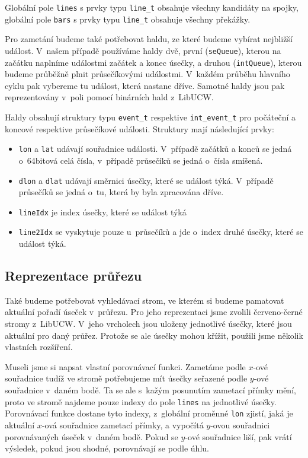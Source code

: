 Globální pole \verb|lines| s prvky typu \verb|line_t| obsahuje všechny kandidáty
na spojky, globální pole \verb|bars| s prvky typu \verb|line_t| obsahuje všechny
překážky. 

Pro zametání budeme také potřebovat haldu, ze které budeme vybírat nejbližší
událost. V~našem případě používáme haldy dvě, první (\verb|seQueue|), kterou na
začátku naplníme událostmi začátek a konec úsečky, a druhou (\verb|intQueue|),
kterou budeme průběžně plnit průsečíkovými událostmi. V~každém průběhu hlavního
cyklu pak vybereme tu událost, která nastane dříve. Samotné haldy jsou pak
reprezentovány v~poli pomocí binárních hald z~LibUCW. 

Haldy obsahují struktury typu \verb|event_t| respektive \verb|int_event_t| pro
počáteční a koncové respektive průsečíkové události. Struktury mají následující
prvky:
\begin{itemize}
	\item \verb|lon| a \verb|lat| udávají souřadnice události. V~případě
	začátků a konců se jedná o~64bitová celá čísla, v~případě průsečíků se
	jedná o~čísla smíšená. 
	\item \verb|dlon| a \verb|dlat| udávají směrnici úsečky, které se
	událost týká. V~případě průsečíků se jedná o~tu, která by byla
	zpracována dříve.
	\item \verb|lineIdx| je index úsečky, které se událost týká
	\item \verb|line2Idx| se vyskytuje pouze u~průsečíků a jde o~index druhé
	úsečky, které se událost týká.
\end{itemize}


\subsection{Reprezentace průřezu}
Také budeme potřebovat vyhledávací strom, ve kterém si budeme pamatovat aktuální
pořadí úseček v~průřezu. Pro jeho reprezentaci jsme zvolili červeno-černé stromy
z~LibUCW. V~jeho vrcholech jsou uloženy jednotlivé úsečky, které jsou aktuální
pro daný průřez. Protože se ale úsečky mohou křížit, použili jsme několik
vlastních rozšíření. 

Museli jsme si napsat vlastní {\tuc porovnávací funkci}. Zametáme podle $x$-ové
souřadnice tudíž ve stromě potřebujeme mít úsečky seřazené podle $y$-ové
souřadnice v~daném bodě. Ta se ale s~kažým posunutím zametací přímky mění,
proto ve stromě najdeme pouze indexy do pole \verb|lines| na jednotlivé úsečky.
Porovnávací funkce dostane tyto indexy, z~globální proměnné \verb|lon| zjistí,
jaká je aktuální $x$-ová souřadnice zametací přímky, a vypočítá $y$-ovou
souřadnici porovnávaných úseček v~daném bodě. Pokud se $y$-ové souřadnice liší,
pak vrátí výsledek, pokud jsou shodné, porovnávají se podle úhlu. 

